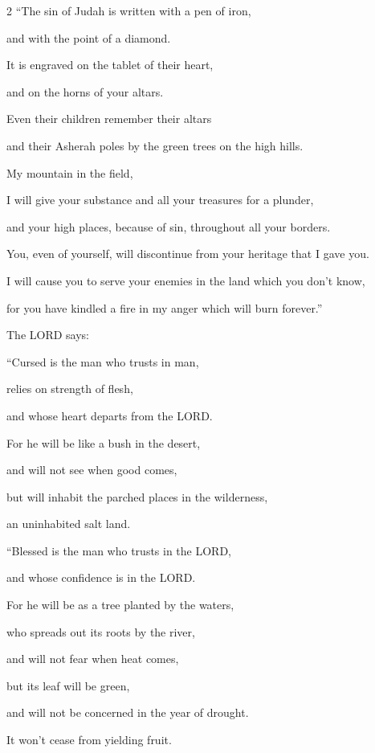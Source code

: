 \mychapter{} 
\begin{multicols}{2}
	\myverse*{}“The sin of Judah is written with a pen of iron,

and with the point of a diamond.

It is engraved on the tablet of their heart,

and on the horns of your altars.


\myverse{}Even their children remember their altars

and their Asherah poles by the green trees on the high hills.


\myverse{}My mountain in the field,

I will give your substance and all your treasures for a plunder,

and your high places, because of sin, throughout all your borders.


\myverse{}You, even of yourself, will discontinue from your heritage that
I gave you.

I will cause you to serve your enemies in the land which you don’t know,

for you have kindled a fire in my anger which will burn forever.”


\myverse{}The LORD says:

“Cursed is the man who trusts in man,

relies on strength of flesh,

and whose heart departs from the LORD.


\myverse{}For he will be like a bush in the desert,

and will not see when good comes,

but will inhabit the parched places in the wilderness,

an uninhabited salt land.

\vspace{\baselineskip}

\myverse{}“Blessed is the man who trusts in the LORD,

and whose confidence is in the LORD.


\myverse{}For he will be as a tree planted by the waters,

who spreads out its roots by the river,

and will not fear when heat comes,

but its leaf will be green,

and will not be concerned in the year of drought.

It won’t cease from yielding fruit.



\end{multicols}
